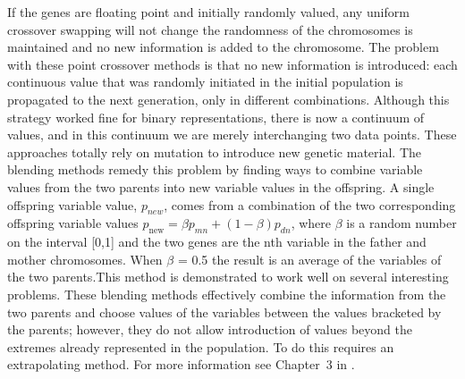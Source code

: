 If the genes are floating point and initially randomly valued, any uniform crossover swapping will not change the randomness of the chromosomes is maintained and no new information is added to the chromosome.
The problem with these point crossover methods is that no new information
is introduced: each continuous value that was randomly initiated in the initial
population is propagated to the next generation, only in different combinations.
Although this strategy worked fine for binary representations, there is
now a continuum of values, and in this continuum we are merely interchanging
two data points. These approaches totally rely on mutation to introduce
new genetic material.
The blending methods remedy this problem by finding ways to combine
variable values from the two parents into new variable values in the offspring.
A single offspring variable value, $p_{new}$, comes from a combination of the two
corresponding offspring variable values $p_{\text {new}}=\beta p_{m n}+(1-\beta) p_{d n}$,
where $\beta$ is a random number on the interval [0,1] and the two genes are the nth variable in the father and mother chromosomes.
When $\beta$ = 0.5 the result is an average of the variables of the two
parents.This method is demonstrated to work well on several interesting problems.
These blending
methods effectively combine the information from the two parents and
choose values of the variables between the values bracketed by the parents;
however, they do not allow introduction of values beyond the extremes
already represented in the population. To do this requires an extrapolating
method.  For more information see Chapter~3 in \cite{Haupt2004}.





